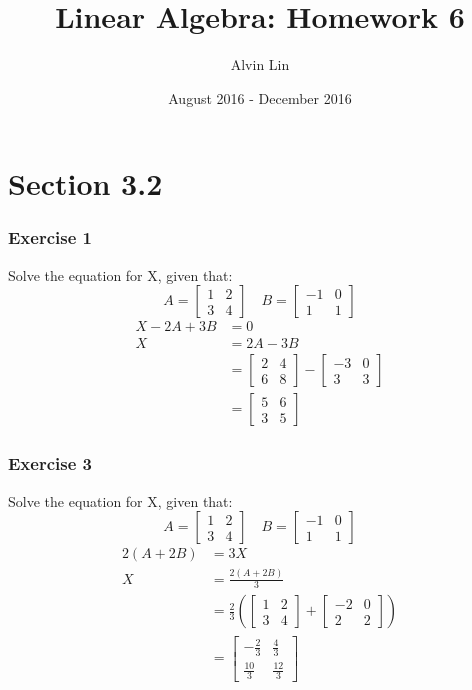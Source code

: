 \documentclass[letterpaper, 12pt]{math}
\title{Linear Algebra: Homework 6}
\author{Alvin Lin}
\date{August 2016 - December 2016}
\begin{document}
\maketitle

\section*{Section 3.2}

\subsubsection*{Exercise 1}
Solve the equation for X, given that:
\[ A = \begin{bmatrix}1 & 2 \\ 3 & 4\end{bmatrix} \quad
  B = \begin{bmatrix}-1 & 0 \\ 1 & 1\end{bmatrix} \]
\begin{align*}
  X-2A+3B &= 0 \\
  X &= 2A-3B \\
  &= \begin{bmatrix}2 & 4 \\ 6 & 8\end{bmatrix}-
    \begin{bmatrix}-3 & 0 \\ 3 & 3\end{bmatrix} \\
  &= \begin{bmatrix}5 & 6 \\ 3 & 5\end{bmatrix}
\end{align*}

\subsubsection*{Exercise 3}
Solve the equation for X, given that:
\[ A = \begin{bmatrix}1 & 2 \\ 3 & 4\end{bmatrix} \quad
  B = \begin{bmatrix}-1 & 0 \\ 1 & 1\end{bmatrix} \]
\begin{align*}
  2(A+2B) &= 3X \\
  X &= \frac{2(A+2B)}{3} \\
  &= \frac{2}{3}\left(\begin{bmatrix}
    1 & 2 \\
    3 & 4
  \end{bmatrix}+\begin{bmatrix}
    -2 & 0 \\
    2 & 2
  \end{bmatrix}\right) \\
  &= \begin{bmatrix}
    -\frac{2}{3} & \frac{4}{3} \\[0.5em]
    \frac{10}{3} & \frac{12}{3}
  \end{bmatrix}
\end{align*}
\end{document}
